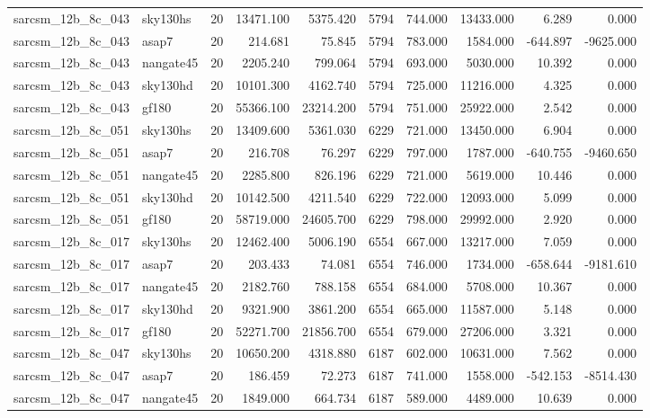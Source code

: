 \begin{longtable}{llrrrrrrrr}
sarcsm\_12b\_8c\_043 & sky130hs & 20 & 13471.100 & 5375.420 & 5794 & 744.000 & 13433.000 & 6.289 & 0.000 \\
sarcsm\_12b\_8c\_043 & asap7 & 20 & 214.681 & 75.845 & 5794 & 783.000 & 1584.000 & -644.897 & -9625.000 \\
sarcsm\_12b\_8c\_043 & nangate45 & 20 & 2205.240 & 799.064 & 5794 & 693.000 & 5030.000 & 10.392 & 0.000 \\
sarcsm\_12b\_8c\_043 & sky130hd & 20 & 10101.300 & 4162.740 & 5794 & 725.000 & 11216.000 & 4.325 & 0.000 \\
sarcsm\_12b\_8c\_043 & gf180 & 20 & 55366.100 & 23214.200 & 5794 & 751.000 & 25922.000 & 2.542 & 0.000 \\
sarcsm\_12b\_8c\_051 & sky130hs & 20 & 13409.600 & 5361.030 & 6229 & 721.000 & 13450.000 & 6.904 & 0.000 \\
sarcsm\_12b\_8c\_051 & asap7 & 20 & 216.708 & 76.297 & 6229 & 797.000 & 1787.000 & -640.755 & -9460.650 \\
sarcsm\_12b\_8c\_051 & nangate45 & 20 & 2285.800 & 826.196 & 6229 & 721.000 & 5619.000 & 10.446 & 0.000 \\
sarcsm\_12b\_8c\_051 & sky130hd & 20 & 10142.500 & 4211.540 & 6229 & 722.000 & 12093.000 & 5.099 & 0.000 \\
sarcsm\_12b\_8c\_051 & gf180 & 20 & 58719.000 & 24605.700 & 6229 & 798.000 & 29992.000 & 2.920 & 0.000 \\
sarcsm\_12b\_8c\_017 & sky130hs & 20 & 12462.400 & 5006.190 & 6554 & 667.000 & 13217.000 & 7.059 & 0.000 \\
sarcsm\_12b\_8c\_017 & asap7 & 20 & 203.433 & 74.081 & 6554 & 746.000 & 1734.000 & -658.644 & -9181.610 \\
sarcsm\_12b\_8c\_017 & nangate45 & 20 & 2182.760 & 788.158 & 6554 & 684.000 & 5708.000 & 10.367 & 0.000 \\
sarcsm\_12b\_8c\_017 & sky130hd & 20 & 9321.900 & 3861.200 & 6554 & 665.000 & 11587.000 & 5.148 & 0.000 \\
sarcsm\_12b\_8c\_017 & gf180 & 20 & 52271.700 & 21856.700 & 6554 & 679.000 & 27206.000 & 3.321 & 0.000 \\
sarcsm\_12b\_8c\_047 & sky130hs & 20 & 10650.200 & 4318.880 & 6187 & 602.000 & 10631.000 & 7.562 & 0.000 \\
sarcsm\_12b\_8c\_047 & asap7 & 20 & 186.459 & 72.273 & 6187 & 741.000 & 1558.000 & -542.153 & -8514.430 \\
sarcsm\_12b\_8c\_047 & nangate45 & 20 & 1849.000 & 664.734 & 6187 & 589.000 & 4489.000 & 10.639 & 0.000 \\

\end{longtable}
